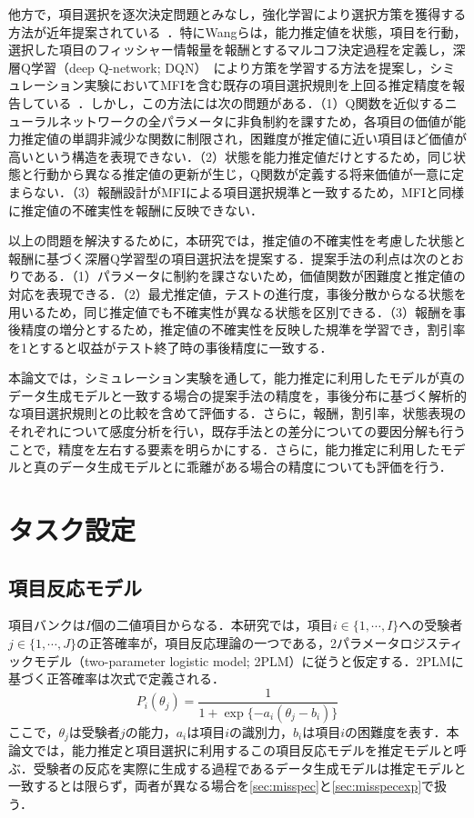 \documentclass[paper]{ieicej}
\begin{document}
他方で，項目選択を逐次決定問題とみなし，強化学習により選択方策を獲得する方法が近年提案されている~\cite{GhoshLan2021,WangLiuXu2024}．特にWangらは，能力推定値を状態，項目を行動，選択した項目のフィッシャー情報量を報酬とするマルコフ決定過程を定義し，深層Q学習（deep Q-network; DQN）~\cite{Mnih2015}により方策を学習する方法を提案し，シミュレーション実験においてMFIを含む既存の項目選択規則を上回る推定精度を報告している~\cite{WangLiuXu2024}．しかし，この方法には次の問題がある．（1）Q関数を近似するニューラルネットワークの全パラメータに非負制約を課すため，各項目の価値が能力推定値の単調非減少な関数に制限され，困難度が推定値に近い項目ほど価値が高いという構造を表現できない．（2）状態を能力推定値だけとするため，同じ状態と行動から異なる推定値の更新が生じ，Q関数が定義する将来価値が一意に定まらない．（3）報酬設計がMFIによる項目選択規準と一致するため，MFIと同様に推定値の不確実性を報酬に反映できない．

以上の問題を解決するために，本研究では，推定値の不確実性を考慮した状態と報酬に基づく深層Q学習型の項目選択法を提案する．提案手法の利点は次のとおりである．（1）パラメータに制約を課さないため，価値関数が困難度と推定値の対応を表現できる．（2）最尤推定値，テストの進行度，事後分散からなる状態を用いるため，同じ推定値でも不確実性が異なる状態を区別できる．（3）報酬を事後精度の増分とするため，推定値の不確実性を反映した規準を学習でき，割引率を1とすると収益がテスト終了時の事後精度に一致する．%

本論文では，シミュレーション実験を通して，能力推定に利用したモデルが真のデータ生成モデルと一致する場合の提案手法の精度を，事後分布に基づく解析的な項目選択規則との比較を含めて評価する．さらに，報酬，割引率，状態表現のそれぞれについて感度分析を行い，既存手法との差分についての要因分解も行うことで，精度を左右する要素を明らかにする．さらに，能力推定に利用したモデルと真のデータ生成モデルとに乖離がある場合の精度についても評価を行う．

\section{タスク設定}\label{sec:task}

\subsection{項目反応モデル}\label{sec:model}

項目バンクは$I$個の二値項目からなる．本研究では，項目$i\in\{1,\cdots,I\}$への受験者$j\in\{1,\cdots,J\}$の正答確率が，項目反応理論の一つである，2パラメータロジスティックモデル（two-parameter logistic model; 2PLM）に従うと仮定する．2PLMに基づく正答確率は次式で定義される．
\begin{equation}
 P_i(\theta_j)=\frac{1}{1+\exp\{-a_i(\theta_j-b_i)\}}
 \label{eq:2pl}
\end{equation}
ここで，$\theta_j$は受験者$j$の能力，$a_i$は項目$i$の識別力，$b_i$は項目$i$の困難度を表す．本論文では，能力推定と項目選択に利用するこの項目反応モデルを推定モデルと呼ぶ．受験者の反応を実際に生成する過程であるデータ生成モデルは推定モデルと一致するとは限らず，両者が異なる場合を\ref{sec:misspec}と\ref{sec:misspecexp}で扱う．
\end{document}
